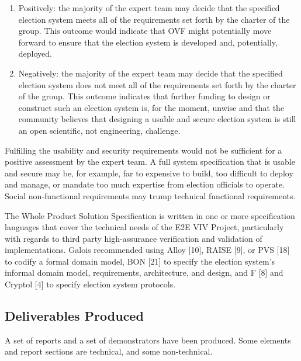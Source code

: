 \begin{enumerate}
\item Positively: the majority of the expert team may decide that the
  specified election system meets all of the requirements set forth by
  the charter of the group. This outcome would indicate that OVF might
  potentially move forward to ensure that the election system is
  developed and, potentially, deployed.
\item Negatively: the majority of the expert team may decide that the
  specified election system does not meet all of the requirements set
  forth by the charter of the group. This outcome indicates that
  further funding to design or construct such an election system is,
  for the moment, unwise and that the community believes that
  designing a usable and secure election system is still an open
  scientific, not engineering, challenge.
\end{enumerate}

Fulfilling the usability and security requirements would not be
sufficient for a positive assessment by the expert team. A full system
specification that is usable and secure may be, for example, far to
expensive to build, too difficult to deploy and manage, or mandate too
much expertise from election officials to operate. Social
non-functional requirements may trump technical functional
requirements.

The Whole Product Solution Specification is written in one or more
specification languages that cover the technical needs of the E2E VIV
Project, particularly with regards to third party high-assurance
verification and validation of implementations. Galois recommended
using Alloy [10], RAISE [9], or PVS [18] to codify a formal domain
model, BON [21] to specify the election system's informal domain
model, requirements, architecture, and design, and F [8] and Cryptol
[4] to specify election system protocols.


\subsection{Deliverables Produced}
\label{sec:deliv-prod}

A set of reports and a set of demonstrators have been produced. Some
elements and report sections are technical, and some non-technical.

